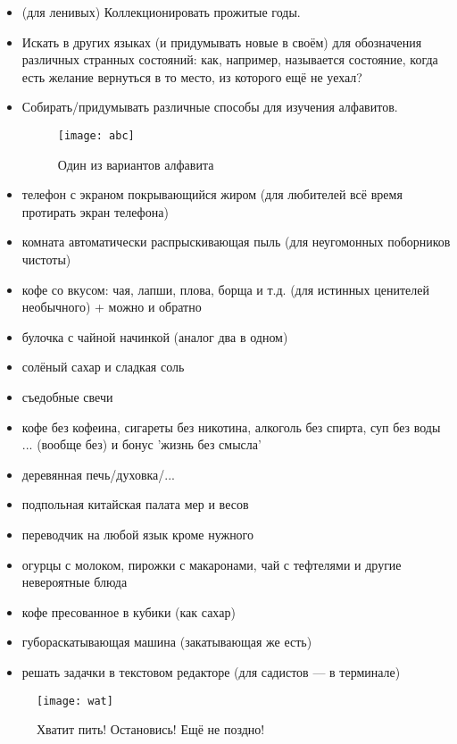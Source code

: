 \begin{itemize}
    \item (для ленивых) Коллекционировать прожитые годы.
    \item Искать в других языках (и придумывать новые в своём) для обозначения различных странных состояний: как, например, называется состояние, когда есть желание вернуться в то место, из которого ещё не уехал?
    \item Собирать/придумывать различные способы для изучения алфавитов.
    
    \begin{figure}[ht!]
        \centering
        \texttt{[image: abc]}
        \caption{Один из вариантов алфавита}
    \end{figure}
    
    \item телефон с экраном покрывающийся жиром (для любителей всё время протирать экран телефона)
    \item комната автоматически распрыскивающая пыль (для неугомонных поборников чистоты)
    \item кофе со вкусом: чая, лапши, плова, борща и т.д. (для истинных ценителей необычного) + можно и обратно
    \item булочка с чайной начинкой (аналог два в одном)
    \item солёный сахар и сладкая соль
    \item съедобные свечи
    \item кофе без кофеина, сигареты без никотина, алкоголь без спирта, суп без воды ... (вообще без) и бонус 'жизнь без смысла'
    \item деревянная печь/духовка/...
    \item подпольная китайская палата мер и весов
    \item переводчик на любой язык кроме нужного
    \item огурцы с молоком, пирожки с макаронами, чай с тефтелями и другие невероятные блюда
    \item кофе пресованное в кубики (как сахар)
    \item губораскатывающая машина (закатывающая же есть)
    \item решать задачки в текстовом редакторе (для садистов --- в терминале)
\end{itemize}
\begin{figure}[ht!]
    \centering
    \texttt{[image: wat]}
    \caption{Хватит пить! Остановись! Ещё не поздно!}
\end{figure}
